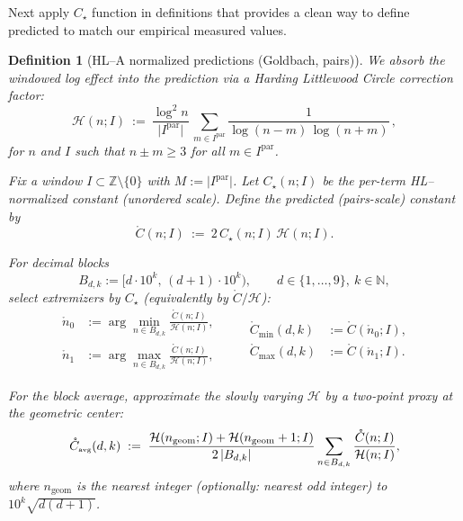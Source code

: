 \documentclass[11pt]{article}
\DeclarePairedDelimiter{\card}{\lvert}{\rvert}
\theoremstyle{inline}
\theoremstyle{break}
\theoremstyle{break}
\theoremstyle{break}
\theoremstyle{break}
\theoremstyle{break}
\theoremstyle{break}
\theoremstyle{break}
\newtheorem{definition}{Definition}
\theoremstyle{inline}
\newcommand{\tavg}{{\scriptscriptstyle\mathrm{avg}}}
\newcommand{\Cpred}{\mathring{C}}   %
\newcommand{\Npred}{\mathring{n}}   %
\newcommand{\Ipar}{I^{\mathrm{par}}}
\newcommand{\Ngeom}{n_\mathrm{geom}}
\newcommand{\HLCorr}{\mathcal{H}}
\begin{document}
Next apply \( C_\star \) function in definitions that provides a clean way to define predicted to match our empirical measured values.

\begin{definition}[HL–A normalized predictions (Goldbach, pairs)]
We absorb the windowed log effect into the prediction via a Harding Littlewood Circle correction factor:
\begin{equation}
\HLCorr(n;I)\ :=\ \frac{\log^2 n}{\lvert \Ipar\rvert}\,
\sum_{m\in \Ipar}\frac{1}{\log(n-m)\,\log(n+m)}\,,
\end{equation}
for \(n\) and \(I\) such that \(n\pm m\ge 3\) for all \(m\in\Ipar\).

Fix a window \(I\subset\mathbb Z\setminus\{0\}\) with \(M:=\lvert\Ipar\rvert\).
Let \(C_\star(n;I)\) be the per-term HL–normalized constant (unordered scale).
Define the \emph{predicted (pairs-scale) constant} by
\begin{equation}
\Cpred(n;I)\ :=\ 2\,C_\star(n;I)\,\HLCorr(n;I).
\end{equation}

For decimal blocks
\begin{equation}
B_{d,k}:=\big[d\cdot10^k,\,(d+1)\cdot10^k\big),\qquad d\in\{1,\dots,9\},\ k\in\mathbb N,
\end{equation}
select extremizers by \(C_\star\) (equivalently by \(\Cpred/\HLCorr\)):
\begin{equation}
\begin{aligned}
\Npred_0 &:= \arg\min_{n\in B_{d,k}} \frac{\Cpred(n;I)}{\HLCorr(n;I)}, \\
\Npred_1 &:= \arg\max_{n\in B_{d,k}} \frac{\Cpred(n;I)}{\HLCorr(n;I)},
\end{aligned}
\qquad
\begin{aligned}
\Cpred_{\min}(d,k) &:= \Cpred(\Npred_0;I),\\
\Cpred_{\max}(d,k) &:= \Cpred(\Npred_1;I).
\end{aligned}
\end{equation}

For the block average, approximate the slowly varying \(\HLCorr\) by a two-point
proxy at the geometric center:
\begin{equation}
\Cpred_{\tavg}(d,k)
\;:=\;
\frac{\HLCorr(\Ngeom;I)+\HLCorr(\Ngeom+1;I)}{2\,\card{B_{d,k}}}
\sum_{n\in B_{d,k}} \frac{\Cpred(n;I)}{\HLCorr(n;I)},
\end{equation}
where \(\Ngeom\) is the nearest integer (optionally: nearest \emph{odd} integer) to \(10^k\sqrt{d(d+1)}\).
\end{definition}
\end{document}
